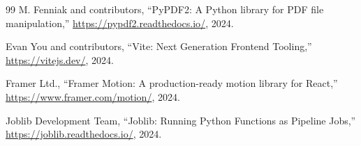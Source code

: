 \begin{thebibliography}{99}
M. Fenniak and contributors, ``PyPDF2: A Python library for PDF file manipulation,'' \url{https://pypdf2.readthedocs.io/}, 2024.

Evan You and contributors, ``Vite: Next Generation Frontend Tooling,'' \url{https://vitejs.dev/}, 2024.

Framer Ltd., ``Framer Motion: A production-ready motion library for React,'' \url{https://www.framer.com/motion/}, 2024.

Joblib Development Team, ``Joblib: Running Python Functions as Pipeline Jobs,'' \url{https://joblib.readthedocs.io/}, 2024.

\end{thebibliography}
